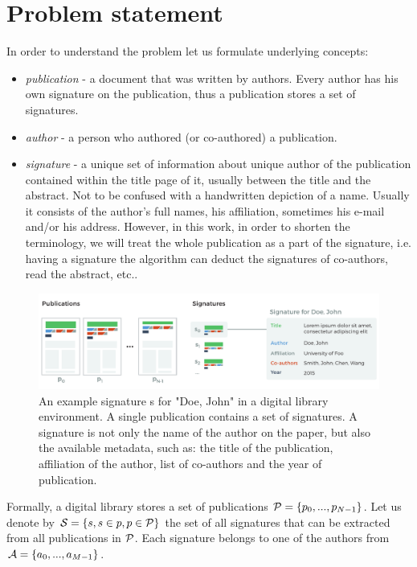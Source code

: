\documentclass{pracamgr}
\begin{document}
\section{Problem statement}

In order to understand the problem let us formulate underlying concepts:

\begin{itemize}
    \item \textit{publication} - a document that was written by
    authors. Every author has his own
    signature on the publication, thus a publication stores a set of
    signatures.
    \item \textit{author} - a person who authored (or co-authored) a publication.
    \item \textit{signature} - a unique set of information about unique author of the
    publication contained within the title page of it, usually between the title and the
    abstract. Not to be confused with a handwritten depiction of a name.
    Usually it consists of the author's full names, his affiliation, sometimes his e-mail
    and/or his address. However, in this work, in order to shorten the terminology, we will
    treat the whole publication as a part of the signature, i.e. having a
    signature the algorithm can deduct the signatures of co-authors, read the abstract,
    etc..
\end{itemize}

\begin{figure}[th!]
\includegraphics[width=\textwidth]{figures/fig-pub-to-signature}
\caption{An example signature s for "Doe, John" in a digital library environment.
A single publication contains a set of signatures. A signature
is not only the name of the author on the paper, but also the available metadata, such as:
the title of the publication, affiliation of the author, list of co-authors and the year of
publication.}
\label{fig:pub-to-signature}
\end{figure}

Formally, a digital library stores a set of publications ${\cal P} = \{ p_0, ...,
p_{N-1}\}$. Let us denote by ${\cal S} = \{ s, s \in p, p \in {\cal P}
\}$ the set of all signatures that can be extracted from all publications in ${\cal P}$.
Each signature belongs to one of the authors from  ${\cal A} = \{ a_0, ..., a_{M-1}\}$.
\end{document}
